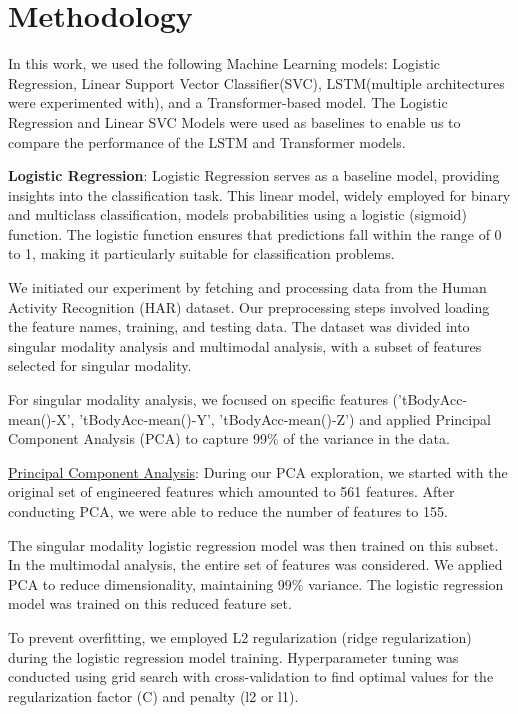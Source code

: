 \documentclass[conference]{IEEEtran}
\begin{document}
\section{Methodology}
In this work, we used the following Machine Learning models: Logistic Regression, Linear Support Vector Classifier(SVC), LSTM(multiple architectures were experimented with), and a Transformer-based model. The Logistic Regression and Linear SVC Models were used as baselines to enable us to compare the performance of the LSTM and Transformer models. \newline 

\textbf{Logistic Regression}: 
Logistic Regression serves as a baseline model, providing insights into the classification task. This linear model, widely employed for binary and multiclass classification, models probabilities using a logistic (sigmoid) function. The logistic function ensures that predictions fall within the range of 0 to 1, making it particularly suitable for classification problems.

We initiated our experiment by fetching and processing data from the Human Activity Recognition (HAR) dataset. Our preprocessing steps involved loading the feature names, training, and testing data. The dataset was divided into singular modality analysis and multimodal analysis, with a subset of features selected for singular modality.

For singular modality analysis, we focused on specific features ('tBodyAcc-mean()-X', 'tBodyAcc-mean()-Y', 'tBodyAcc-mean()-Z') and applied Principal Component Analysis (PCA) to capture 99\% of the variance in the data. \newline 

\underline{Principal Component Analysis}: During our PCA exploration, we started with the original set of engineered features which amounted to 561 features. After conducting PCA, we were able to reduce the number of features to 155. 


The singular modality logistic regression model was then trained on this subset. In the multimodal analysis, the entire set of features was considered. We applied PCA to reduce dimensionality, maintaining 99\% variance. The logistic regression model was trained on this reduced feature set.

To prevent overfitting, we employed L2 regularization (ridge regularization) during the logistic regression model training. Hyperparameter tuning was conducted using grid search with cross-validation to find optimal values for the regularization factor (C) and penalty (l2 or l1).
\end{document}
